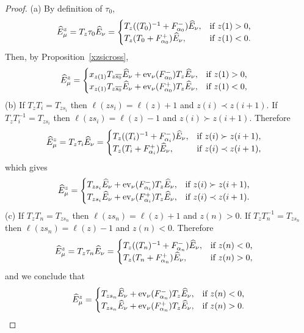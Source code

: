 \documentclass[11pt]{article}
\theoremstyle{plain}
\theoremstyle{definition}
\theoremstyle{remark}
\numberwithin{equation}{section}
\def\ev{\mathrm{ev}}
\newcounter{r}
\newcounter{s}
\begin{document}
\begin{proof}
(a) By definition of $\tau_0$,
\begin{align*}
\widehat{E}^z_\mu &= T_z \tau_0 \widehat{E}_\nu
=\begin{cases}
T_z((T_0)^{-1}+F_{\alpha_0}^-)\widehat{E}_\nu, &\hbox{if $z(1)>0$,} \\
T_z(T_0 +F_{\alpha_0}^+)\widehat{E}_\nu, &\hbox{if $z(1)<0$.}
\end{cases}
\end{align*}
Then, by Proposition~\ref{xzsicross},
\begin{align*}
\widehat{E}^z_\mu 
&= \begin{cases}
x_{z(1)}T_{z\overline{s_0}} \widehat{E}_\nu + \ev_\nu(F^-_{\alpha_0}) T_z\widehat{E}_\nu, &\hbox{if $z(1)>0$,} \\
x_{z(1)}T_{z\overline{s_0}} \widehat{E}_\nu + \ev_\nu(F^+_{\alpha_0}) T_z \widehat{E}_\nu, &\hbox{if $z(1)<0$,} 
\end{cases}
\end{align*}
(b) If $T_z T_i = T_{zs_i}$ then $\ell(zs_i) = \ell(z)+1$ and $z(i)\prec z(i+1)$.  
If $T_zT_i^{-1} = T_{zs_i}$  then $\ell(zs_i) = \ell(z)-1$ and 
$z(i)\succ z(i+1)$.  Therefore
\begin{align*}
\widehat{E}^z_\mu 
&= T_z \tau_i \widehat{E}_\nu
=\begin{cases}
T_z((T_i)^{-1}+F_{\alpha_i}^-)\widehat{E}_\nu, &\hbox{if $z(i)\succ z(i+1)$,} \\
T_z(T_i +F_{\alpha_i}^+)\widehat{E}_\nu, &\hbox{if $z(i)\prec z(i+1)$,}
\end{cases}
\end{align*}
which gives
\begin{align*}
\widehat{E}^z_\mu 
&= \begin{cases}
T_{zs_i} \widehat{E}_\nu + \ev_\nu(F^-_{\alpha_i}) T_z\widehat{E}_\nu, &\hbox{if $z(i)\succ z(i+1)$,} \\
T_{zs_i} \widehat{E}_\nu + \ev_\nu(F^+_{\alpha_i}) T_z \widehat{E}_\nu, &\hbox{if $z(i)\prec z(i+1)$.} 
\end{cases}
\end{align*}
(c) If $T_z T_n = T_{zs_n}$ then $\ell(zs_n)=\ell(z)+1$ and $z(n)>0$.  If $T_zT_n^{-1} = T_{zs_n}$  then $\ell(zs_n)=\ell(z)-1$ and $z(n)<0$.  Therefore
\begin{align*}
\widehat{E}^z_\mu 
&= T_z \tau_n \widehat{E}_\nu
=\begin{cases}
T_z((T_n)^{-1}+F_{\alpha_n}^-)\widehat{E}_\nu, &\hbox{if $z(n)<0$,} \\
T_z(T_n +F_{\alpha_n}^+)\widehat{E}_\nu, &\hbox{if $z(n)>0$,}
\end{cases}
\end{align*}
and we conclude that
\[
\widehat{E}^z_\mu 
= \begin{cases}
T_{zs_n} \widehat{E}_\nu + \ev_\nu(F^-_{\alpha_n}) T_z\widehat{E}_\nu, &\hbox{if $z(n)<0$,} \\
T_{zs_n} \widehat{E}_\nu + \ev_\nu(F^+_{\alpha_n}) T_z \widehat{E}_\nu, &\hbox{if $z(n)>0$.} 
\end{cases}
\]
\end{proof}
\end{document}
